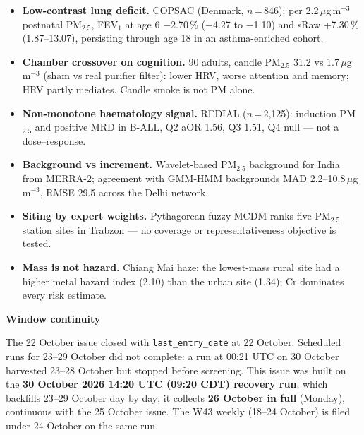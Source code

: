\documentclass[10pt]{article}
\begin{document}
\footnotesize
\begin{itemize}

\item \textbf{Low-contrast lung deficit.} COPSAC (Denmark, $n$\,=\,846): per 2.2\,$\mu$g\,m$^{-3}$ postnatal PM$_{2.5}$,
FEV$_1$ at age 6 $-$2.70\,\% ($-$4.27 to $-$1.10) and sRaw +7.30\,\% (1.87--13.07), persisting through age 18 in an
asthma-enriched cohort.

\item \textbf{Chamber crossover on cognition.} 90 adults, candle PM$_{2.5}$ 31.2 vs 1.7\,$\mu$g\,m$^{-3}$ (sham vs real
purifier filter): lower HRV, worse attention and memory; HRV partly mediates. Candle smoke is not PM alone.

\item \textbf{Non-monotone haematology signal.} REDIAL ($n$\,=\,2,125): induction PM$_{2.5}$ and positive MRD in B-ALL,
Q2 aOR 1.56, Q3 1.51, Q4 null --- not a dose--response.

\item \textbf{Background vs increment.} Wavelet-based PM$_{2.5}$ background for India from MERRA-2; agreement with GMM-HMM
backgrounds MAD 2.2--10.8\,$\mu$g\,m$^{-3}$, RMSE 29.5 across the Delhi network.

\item \textbf{Siting by expert weights.} Pythagorean-fuzzy MCDM ranks five PM$_{2.5}$ station sites in Trabzon --- no
coverage or representativeness objective is tested.

\item \textbf{Mass is not hazard.} Chiang Mai haze: the lowest-mass rural site had a higher metal hazard index (2.10) than
the urban site (1.34); Cr dominates every risk estimate.

\end{itemize}

\vspace{2mm}

\begin{keybox}
{\sffamily\bfseries\footnotesize\color{Deep}Window continuity}\\[1.2mm]
{\fontsize{7.2}{8.8}\selectfont
The 22 October issue closed with \texttt{last\_entry\_date} at 22 October. Scheduled runs for 23--29 October did
not complete: a run at 00:21 UTC on 30 October harvested 23--28 October but stopped before screening. This issue was
built on the \textbf{30 October 2026 14:20 UTC (09:20 CDT) recovery run}, which backfills 23--29 October day by day; it collects
\textbf{26 October in full} (Monday), continuous with the 25 October issue. The W43 weekly (18--24 October) is filed
under 24 October on the same run.\par}
\end{keybox}
\end{document}
